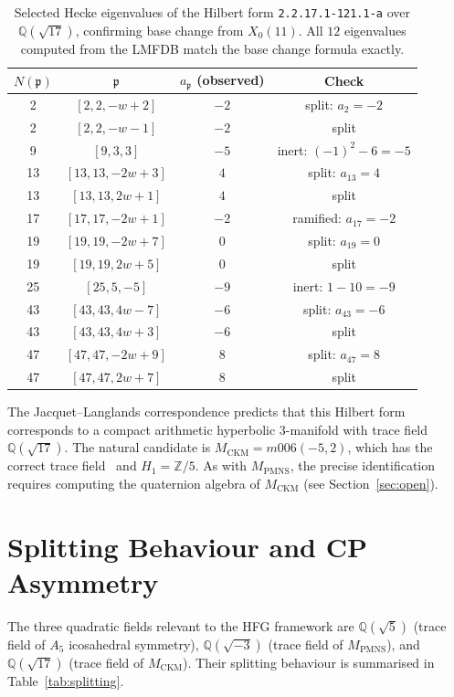 \documentclass[11pt,a4paper]{article}
\theoremstyle{definition}
\newcommand{\QQ}{\mathbb{Q}}
\newcommand{\ZZ}{\mathbb{Z}}
\newcommand{\MPMNS}{M_{\mathrm{PMNS}}}
\newcommand{\MCKM}{M_{\mathrm{CKM}}}
\begin{document}
\begin{table}[htbp]
\centering
\caption{Selected Hecke eigenvalues of the Hilbert form
\texttt{2.2.17.1-121.1-a} over $\QQ(\sqrt{17})$, confirming
base change from $X_0(11)$.
All $12$ eigenvalues computed from the LMFDB match the
base change formula exactly.}
\label{tab:hilbert}
\begin{tabular}{cccc}
\toprule
$N(\mathfrak{p})$ & $\mathfrak{p}$ & $a_{\mathfrak{p}}$ (observed) & Check \\
\midrule
2  & $[2,2,-w+2]$ & $-2$ & split: $a_2=-2$ \\
2  & $[2,2,-w-1]$ & $-2$ & split \\
9  & $[9,3,3]$    & $-5$ & inert: $(-1)^2-6=-5$ \\
13 & $[13,13,-2w+3]$ & $4$ & split: $a_{13}=4$ \\
13 & $[13,13,2w+1]$ & $4$ & split \\
17 & $[17,17,-2w+1]$ & $-2$ & ramified: $a_{17}=-2$ \\
19 & $[19,19,-2w+7]$ & $0$ & split: $a_{19}=0$ \\
19 & $[19,19,2w+5]$ & $0$ & split \\
25 & $[25,5,-5]$   & $-9$ & inert: $1-10=-9$ \\
43 & $[43,43,4w-7]$ & $-6$ & split: $a_{43}=-6$ \\
43 & $[43,43,4w+3]$ & $-6$ & split \\
47 & $[47,47,-2w+9]$ & $8$ & split: $a_{47}=8$ \\
47 & $[47,47,2w+7]$ & $8$ & split \\
\bottomrule
\end{tabular}
\end{table}

The Jacquet--Langlands correspondence predicts that this Hilbert
form corresponds to a compact arithmetic hyperbolic 3-manifold with
trace field $\QQ(\sqrt{17})$.
The natural candidate is $\MCKM = m006(-5,2)$, which has the correct
trace field~\cite{MaclachlanReid} and $H_1=\ZZ/5$.
As with $\MPMNS$, the precise identification requires computing the
quaternion algebra of $\MCKM$ (see Section~\ref{sec:open}).

\section{Splitting Behaviour and CP Asymmetry}
\label{sec:cp}

The three quadratic fields relevant to the HFG framework are
$\QQ(\sqrt{5})$ (trace field of $A_5$ icosahedral symmetry),
$\QQ(\sqrt{-3})$ (trace field of $\MPMNS$), and
$\QQ(\sqrt{17})$ (trace field of $\MCKM$).
Their splitting behaviour is summarised in
Table~\ref{tab:splitting}.
\end{document}
